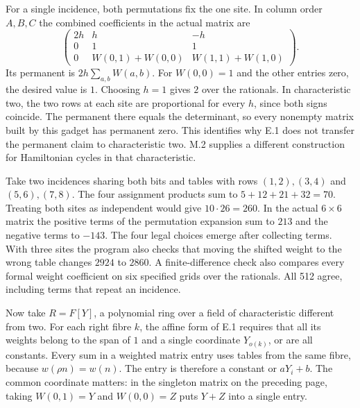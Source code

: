 For a single incidence, both permutations fix the one site. In column
order $A,B,C$ the combined coefficients in the actual matrix are
\[
 \begin{pmatrix}
     2h & h & -h\\
     0  & 1 & 1\\
     0  & W(0,1)+W(0,0) & W(1,1)+W(1,0)
 \end{pmatrix}.
\]
Its permanent is $2h\sum_{a,b}W(a,b)$. For $W(0,0)=1$ and the other
entries zero, the desired value is $1$. Choosing $h=1$ gives $2$ over
the rationals. In characteristic two, the two rows at each site are
proportional for every $h$, since both signs coincide. The permanent
there equals the determinant, so every nonempty matrix built by this
gadget has permanent zero. This identifies why E.1 does not transfer
the permanent claim to characteristic two. M.2 supplies a different
construction for Hamiltonian cycles in that characteristic.

Take two incidences sharing both bits and tables with rows
$(1,2),(3,4)$ and $(5,6),(7,8)$. The four assignment products sum to
$5+12+21+32=70$. Treating both sites as independent would give
$10\cdot26=260$. In the actual $6\times6$ matrix the positive terms of
the permutation expansion sum to $213$ and the negative terms to $-143$.
The four legal choices emerge after collecting terms. With three sites
the program also checks that moving the shifted weight to the wrong
table changes $2924$ to $2860$. A finite-difference check also compares
every formal weight coefficient on six specified grids over the rationals.
All 512 agree, including terms that repeat an incidence.


\newpage
{}
Now take $R=F[Y]$, a polynomial ring over a field of characteristic
different from two. For each right fibre $k$, the affine form of E.1
requires that all its weights belong to the span of $1$ and a single
coordinate $Y_{o(k)}$, or are all constants. Every sum in a weighted
matrix entry uses tables from the same fibre, because $w(\rho n)=w(n)$.
The entry is therefore a constant or $aY_i+b$. The common coordinate
matters: in the singleton matrix on the preceding page, taking
$W(0,1)=Y$ and $W(0,0)=Z$ puts $Y+Z$ into a single entry.


